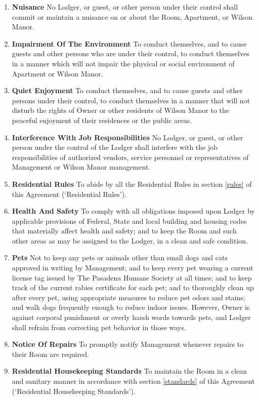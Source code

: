 \documentclass[12pt,letterpaper]{article}
\newcommand{\rules}{Residential Rules}							%
\newcommand{\standards}{Residential Housekeeping Standards}	%
\newcommand{\management}{Management}
\newcommand{\condo}{Wilson Manor}
\newcommand{\apt}{Apartment}
\newcommand{\room}{Room}
\newcommand{\lodger}{Lodger}
\begin{document}
\begin{enumerate}
		\begin{enumerate}
			\item \textbf{Nuisance} \quad No \lodger{}, or guest, or other person under their control shall commit or maintain a nuisance on or about the \room{}, \apt{}, or \condo{}. 
			\item \textbf{Impairment Of The Environment} \quad To conduct themselves, and to cause guests and other persons who are under their control, to conduct themselves in a manner which will not impair the physical or social environment of \apt{} or \condo{}. 
			\item \textbf{Quiet Enjoyment} \quad To conduct themselves, and to cause guests and other persons under their control, to conduct themselves in a manner that will not disturb the rights of Owner or other residents of \condo{} to the peaceful enjoyment of their residences or the public areas. 
			\item \textbf{Interference With Job Responsibilities} \quad No \lodger{}, or guest, or other person under the control of the \lodger{} shall interfere with the job responsibilities of authorized vendors, service personnel or representatives of \management{} or \condo{} management. 
			\item \textbf{\rules{}} \quad To abide by all the \rules{} in section \ref{rules} of this Agreement (`\rules').
			\item \textbf{Health And Safety} \quad To comply with all obligations imposed upon \lodger{} by applicable provisions of Federal, State and local building and housing codes that materially affect health and safety; and to keep the \room{} and such other areas as may be assigned to the \lodger{}, in a clean and safe condition. 
			\item \textbf{Pets} \quad Not to keep any pets or animals other than small dogs and cats approved in writing by \management{}; and to keep every pet wearing a current license tag issued by The Pasadena Humane Society at all times; and to keep track of the current rabies certificate for each pet; and to thoroughly clean up after every pet, using appropriate measures to reduce pet odors and stains; and walk dogs frequently enough to reduce indoor issues. However, Owner is against corporal punishment or overly harsh words towards pets, and \lodger{} shall refrain from correcting pet behavior in those ways.
			\item \textbf{Notice Of Repairs} \quad To promptly notify \management{} whenever repairs to their \room{} are required. 
			\item \textbf{\standards{}} \quad To maintain the \room{} in a clean and sanitary manner in accordance with section \ref{standards} of this Agreement (`\standards{}').

\end{enumerate}
\end{enumerate}
\end{document}
